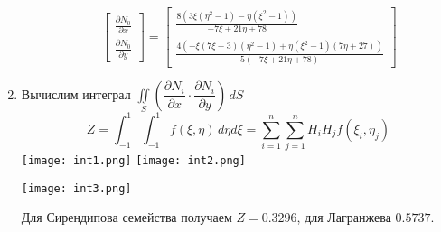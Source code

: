 \documentclass[a4paper, 12pt]{article}
\begin{document}
\begin{enumerate}
\begin{enumerate}
			\[
				\begin{bmatrix}
				\frac{\partial N_0}{\partial x} \\ 
				\frac{\partial N_0}{\partial y}
				\end{bmatrix}
				=
				\left[\begin{matrix}\frac{8 \left(3\xi \left(\eta^{2} - 1\right) -\eta \left(\xi^{2} - 1\right)\right)}{- 7\xi + 21\eta + 78}\\\frac{4 \left(-\xi \left(7\xi + 3\right) \left(\eta^{2} - 1\right) +\eta \left(\xi^{2} - 1\right) \left(7\eta + 27\right)\right)}{5 \left(- 7\xi + 21\eta + 78\right)}\end{matrix}\right]
			\]
		\end{enumerate}
		\newpage
		\item Вычислим интеграл $\displaystyle \iint\limits_S \left(\dfrac{\partial N_i}{\partial x}\cdot \dfrac{\partial N_i}{\partial y}\right)\, dS$
		\[
			Z = \int_{-1}^{1} \int_{-1}^{1} f(\xi, \eta) \, d\eta d\xi = \sum_{i=1}^n \sum_{j=1}^n H_i H_j f(\xi_i, \eta_j)
		\]
		\texttt{[image: int1.png]}
		\texttt{[image: int2.png]}
		\begin{center}
			\texttt{[image: int3.png]}
		\end{center}
		Для Сирендипова семейства получаем \(Z = 0.3296\), для Лагранжева \(0.5737\).

	\end{enumerate}
	
\end{document}
